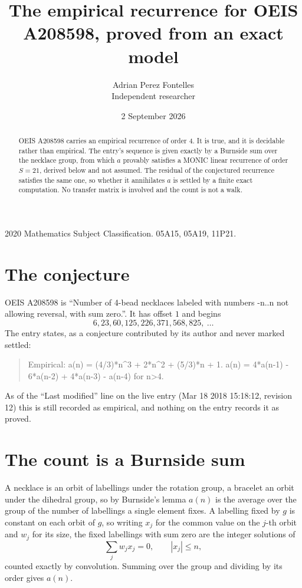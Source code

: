 \documentclass[11pt,a4paper]{article}
\title{The empirical recurrence for OEIS A208598, proved from an exact model}
\author{Adrian Perez Fontelles\\ \small Independent researcher}
\date{2 September 2026}
\theoremstyle{plain}
\theoremstyle{definition}
\begin{document}
\maketitle

\begin{abstract}
OEIS A208598 carries an empirical recurrence of order $4$. It is true, and it is
decidable rather than empirical. The entry's sequence is given exactly by a Burnside sum over the necklace group, from
which $a$ provably satisfies a MONIC linear recurrence of order $S=21$, derived below and not
assumed. The residual of the conjectured recurrence satisfies the same one, so whether it
annihilates $a$ is settled by a finite exact computation. No transfer matrix is involved and
the count is not a walk.
\end{abstract}

\noindent\small 2020 Mathematics Subject Classification. 05A15, 05A19, 11P21.\normalsize

\section{The conjecture}

OEIS A208598 is ``Number of 4-bead necklaces labeled with numbers -n..n not allowing reversal, with sum zero.''. It has offset $1$ and begins
\[
6, 23, 60, 125, 226, 371, 568, 825,\ \dots
\]
The entry states, as a conjecture contributed by its author and never marked settled:
\begin{quote}
Empirical: a(n) = (4/3)*n\^{}3 + 2*n\^{}2 + (5/3)*n + 1. a(n) = 4*a(n-1) - 6*a(n-2) + 4*a(n-3) - a(n-4) for n>4.
\end{quote}
As of the ``Last modified'' line on the live entry (Mar 18 2018 15:18:12, revision 12)
this is still recorded as empirical, and nothing on the entry records it as proved.

\section{The count is a Burnside sum}

A necklace is an orbit of labellings under the rotation group, a bracelet an orbit under the
dihedral group, so by Burnside's lemma $a(n)$ is the average over the group of the number of
labellings a single element fixes. A labelling fixed by $g$ is constant on each orbit of $g$,
so writing $x_j$ for the common value on the $j$-th orbit and $w_j$ for its size, the fixed
labellings with sum zero are the integer solutions of
\[
\sum_j w_jx_j = 0,\qquad |x_j|\le n,
\]
counted exactly by convolution. Summing over the group and dividing by its order gives $a(n)$.
\end{document}
